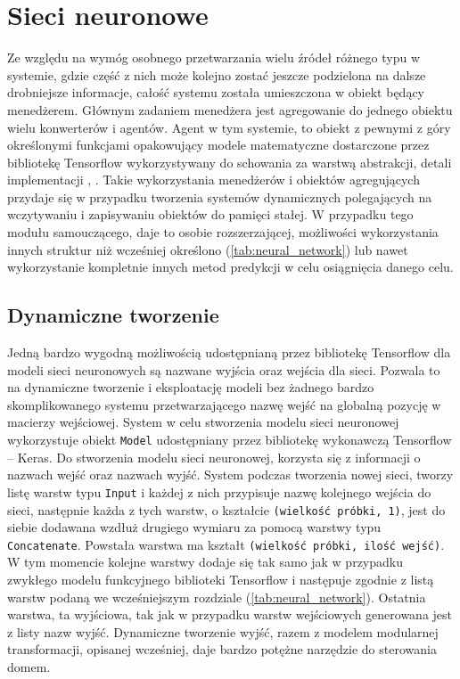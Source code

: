 \section{Sieci neuronowe}
Ze względu na wymóg osobnego przetwarzania wielu źródeł różnego typu w systemie, gdzie część z nich może kolejno zostać jeszcze podzielona na dalsze drobniejsze informacje, całość systemu została umieszczona w obiekt będący menedżerem. Głównym zadaniem menedżera jest agregowanie do jednego obiektu wielu konwerterów i agentów. Agent w tym systemie, to obiekt z pewnymi z góry określonymi funkcjami opakowujący modele matematyczne dostarczone przez bibliotekę Tensorflow wykorzystywany do schowania za warstwą abstrakcji, detali implementacji \cite{book:programming_abstraction}, \cite{book:czysty_kod}. Takie wykorzystania menedżerów i obiektów agregujących przydaje się w przypadku tworzenia systemów dynamicznych polegających na wczytywaniu i zapisywaniu obiektów do pamięci stałej. W przypadku tego modułu samouczącego, daje to osobie rozszerzającej, możliwości wykorzystania innych struktur niż wcześniej określono (\ref{tab:neural_network}) lub nawet wykorzystanie kompletnie innych metod predykcji w celu osiągnięcia danego celu.

\subsection{Dynamiczne tworzenie}
Jedną bardzo wygodną możliwością udostępnianą przez bibliotekę Tensorflow dla modeli sieci neuronowych są nazwane wyjścia oraz wejścia dla sieci. Pozwala to na dynamiczne tworzenie i eksploatację modeli bez żadnego bardzo skomplikowanego systemu przetwarzającego nazwę wejść na globalną pozycję w macierzy wejściowej. System w celu stworzenia modelu sieci neuronowej wykorzystuje obiekt \verb+Model+ udostępniany przez bibliotekę wykonawczą Tensorflow -- Keras. Do stworzenia modelu sieci neuronowej, korzysta się z informacji o nazwach wejść oraz nazwach wyjść. System podczas tworzenia nowej sieci, tworzy listę warstw typu \verb+Input+ i każdej z nich przypisuje nazwę kolejnego wejścia do sieci, następnie każda z tych warstw, o kształcie \verb+(wielkość próbki, 1)+, jest do siebie dodawana wzdłuż drugiego wymiaru za pomocą warstwy typu \verb+Concatenate+. Powstała warstwa ma kształt \verb+(wielkość próbki, ilość wejść)+. W tym momencie kolejne warstwy dodaje się tak samo jak w przypadku zwykłego modelu funkcyjnego biblioteki Tensorflow i następuje zgodnie z listą warstw podaną we wcześniejszym rozdziale (\ref{tab:neural_network}). Ostatnia warstwa, ta wyjściowa, tak jak w przypadku warstw wejściowych generowana jest z listy nazw wyjść. Dynamiczne tworzenie wyjść, razem z modelem modularnej transformacji, opisanej wcześniej, daje bardzo potężne narzędzie do sterowania domem.


